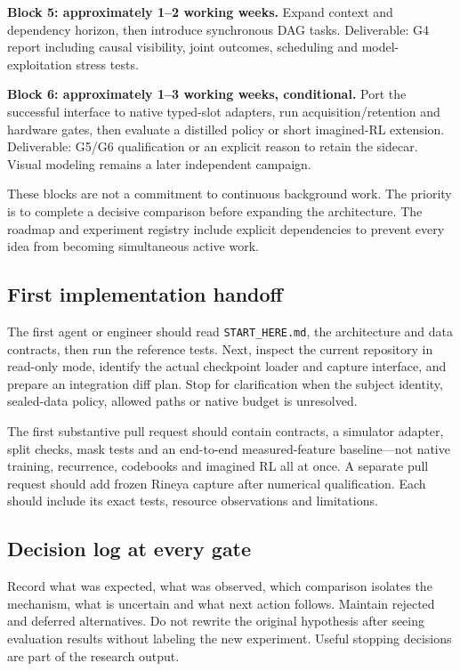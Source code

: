 \documentclass[
  11pt,
  a4paper,
]{article}
\begin{document}
\textbf{Block 5: approximately 1--2 working weeks.} Expand context and
dependency horizon, then introduce synchronous DAG tasks. Deliverable:
G4 report including causal visibility, joint outcomes, scheduling and
model-exploitation stress tests.

\textbf{Block 6: approximately 1--3 working weeks, conditional.} Port
the successful interface to native typed-slot adapters, run
acquisition/retention and hardware gates, then evaluate a distilled
policy or short imagined-RL extension. Deliverable: G5/G6 qualification
or an explicit reason to retain the sidecar. Visual modeling remains a
later independent campaign.

These blocks are not a commitment to continuous background work. The
priority is to complete a decisive comparison before expanding the
architecture. The roadmap and experiment registry include explicit
dependencies to prevent every idea from becoming simultaneous active
work.

\subsection{First implementation
handoff}\label{first-implementation-handoff}

The first agent or engineer should read \texttt{START\_HERE.md}, the
architecture and data contracts, then run the reference tests. Next,
inspect the current repository in read-only mode, identify the actual
checkpoint loader and capture interface, and prepare an integration diff
plan. Stop for clarification when the subject identity, sealed-data
policy, allowed paths or native budget is unresolved.

The first substantive pull request should contain contracts, a simulator
adapter, split checks, mask tests and an end-to-end measured-feature
baseline---not native training, recurrence, codebooks and imagined RL
all at once. A separate pull request should add frozen Rineya capture
after numerical qualification. Each should include its exact tests,
resource observations and limitations.

\subsection{Decision log at every
gate}\label{decision-log-at-every-gate}

Record what was expected, what was observed, which comparison isolates
the mechanism, what is uncertain and what next action follows. Maintain
rejected and deferred alternatives. Do not rewrite the original
hypothesis after seeing evaluation results without labeling the new
experiment. Useful stopping decisions are part of the research output.
\end{document}

